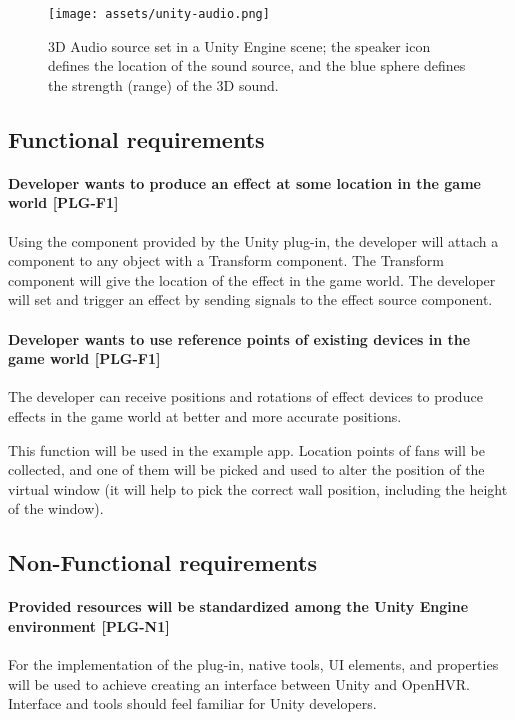 \begin{figure}[h]{}
\centering\texttt{[image: assets/unity-audio.png]}
\caption{3D Audio source set in a Unity Engine scene; the speaker icon defines the location of the sound source, and the blue sphere defines the strength (range) of the 3D sound.}
\end{figure}

\subsection*{Functional requirements}
\hypertarget{x-\textbf{developer-wants-to-produce-an-effect-at-some-location-in-the-game-world}-[plg-f1]}{\paragraph*{\textbf{Developer wants to produce an effect at some location in the game world} [PLG-F1]}}
Using the component provided by the Unity plug-in, the developer will attach
a component to any object with a Transform component. The Transform component
will give the location of the effect in the game world. The developer will
set and trigger an effect by sending signals to the effect source component.


\hypertarget{x-\textbf{developer-wants-to-use-reference-points-of-existing-devices-in-the-game-world}-[plg-f1]}{\paragraph*{\textbf{Developer wants to use reference points of existing devices in the game world} [PLG-F1]}}
The developer can receive
positions and rotations of effect devices to produce effects in the
game world at better and more accurate positions.

This function will be used in the example app. Location points of
fans will be collected, and one of them will be picked and used to alter
the position of the virtual window (it will help to pick the correct wall position,
including the height of the window).

\subsection*{Non-Functional requirements}
\hypertarget{x-\textbf{provided-resources-will-be-standardized-among-the-unity-engine-environment}-[plg-n1]}{\paragraph*{\textbf{Provided resources will be standardized among the Unity Engine environment} [PLG-N1]}}
For the implementation of the plug-in, native tools, UI elements, and properties
will be used to achieve creating an interface between Unity and OpenHVR.
Interface and tools should feel familiar for Unity developers.



